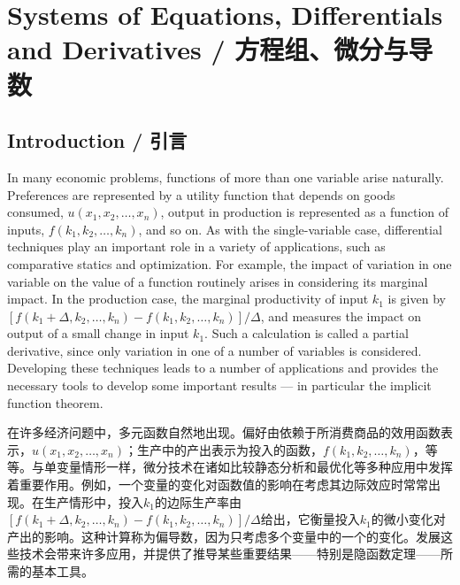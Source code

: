 
\section{Systems of Equations, Differentials and Derivatives / 方程组、微分与导数}

\subsection{Introduction / 引言}

\begin{original}
In many economic problems, functions of more than one variable arise naturally. Preferences are represented by a utility function that depends on goods consumed, $u(x_1, x_2, \dots, x_n)$, output in production is represented as a function of inputs, $f(k_1, k_2, \dots, k_n)$, and so on. As with the single-variable case, differential techniques play an important role in a variety of applications, such as comparative statics and optimization. For example, the impact of variation in one variable on the value of a function routinely arises in considering its marginal impact. In the production case, the marginal productivity of input $k_1$ is given by $[f(k_1 + \Delta, k_2, \dots, k_n) - f(k_1, k_2, \dots, k_n)]/\Delta$, and measures the impact on output of a small change in input $k_1$. Such a calculation is called a partial derivative, since only variation in one of a number of variables is considered. Developing these techniques leads to a number of applications and provides the necessary tools to develop some important results --- in particular the implicit function theorem.
\end{original}
\begin{translation}
在许多经济问题中，多元函数自然地出现。偏好由依赖于所消费商品的效用函数表示，$u(x_1, x_2, \dots, x_n)$；生产中的产出表示为投入的函数，$f(k_1, k_2, \dots, k_n)$，等等。与单变量情形一样，微分技术在诸如比较静态分析和最优化等多种应用中发挥着重要作用。例如，一个变量的变化对函数值的影响在考虑其边际效应时常常出现。在生产情形中，投入$k_1$的边际生产率由$[f(k_1 + \Delta, k_2, \dots, k_n) - f(k_1, k_2, \dots, k_n)]/\Delta$给出，它衡量投入$k_1$的微小变化对产出的影响。这种计算称为偏导数，因为只考虑多个变量中的一个的变化。发展这些技术会带来许多应用，并提供了推导某些重要结果——特别是隐函数定理——所需的基本工具。
\end{translation}

